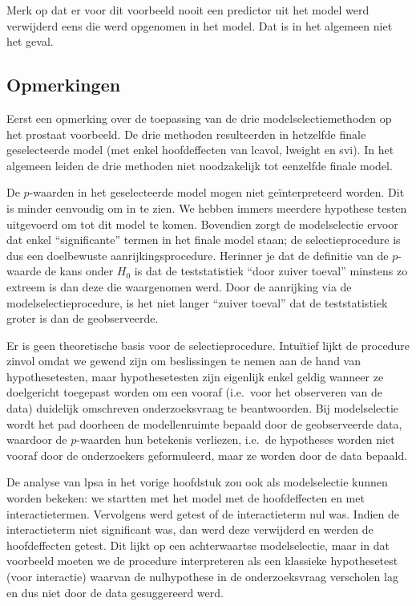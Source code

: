 \documentclass[12pt,dutch,coursenotes]{book}
\theoremstyle{definition}
\theoremstyle{definition}
\theoremstyle{definition}
\theoremstyle{remark}
\begin{document}
Merk op dat er voor dit voorbeeld nooit een predictor uit het model werd
verwijderd eens die werd opgenomen in het model. Dat is in het algemeen
niet het geval.

\subsection{Opmerkingen}\label{opmerkingen}

Eerst een opmerking over de toepassing van de drie modelselectiemethoden
op het prostaat voorbeeld. De drie methoden resulteerden in hetzelfde
finale geselecteerde model (met enkel hoofdeffecten van lcavol, lweight
en svi). In het algemeen leiden de drie methoden niet noodzakelijk tot
eenzelfde finale model.

De \(p\)-waarden in het geselecteerde model mogen niet geïnterpreteerd
worden. Dit is minder eenvoudig om in te zien. We hebben immers meerdere
hypothese testen uitgevoerd om tot dit model te komen. Bovendien zorgt
de modelselectie ervoor dat enkel ``significante'' termen in het finale
model staan; de selectieprocedure is dus een doelbewuste
aanrijkingsprocedure. Herinner je dat de definitie van de \(p\)-waarde
de kans onder \(H_0\) is dat de teststatistiek ``door zuiver toeval''
minstens zo extreem is dan deze die waargenomen werd. Door de aanrijking
via de modelselectieprocedure, is het niet langer ``zuiver toeval'' dat
de teststatistiek groter is dan de geobserveerde.

Er is geen theoretische basis voor de selectieprocedure. Intuïtief lijkt
de procedure zinvol omdat we gewend zijn om beslissingen te nemen aan de
hand van hypothesetesten, maar hypothesetesten zijn eigenlijk enkel
geldig wanneer ze doelgericht toegepast worden om een vooraf (i.e.~voor
het observeren van de data) duidelijk omschreven onderzoeksvraag te
beantwoorden. Bij modelselectie wordt het pad doorheen de modellenruimte
bepaald door de geobserveerde data, waardoor de \(p\)-waarden hun
betekenis verliezen, i.e.~de hypotheses worden niet vooraf door de
onderzoekers geformuleerd, maar ze worden door de data bepaald.

De analyse van lpsa in het vorige hoofdstuk zou ook als modelselectie
kunnen worden bekeken: we startten met het model met de hoofdeffecten en
met interactietermen. Vervolgens werd getest of de interactieterm nul
was. Indien de interactieterm niet significant was, dan werd deze
verwijderd en werden de hoofdeffecten getest. Dit lijkt op een
achterwaartse modelselectie, maar in dat voorbeeld moeten we de
procedure interpreteren als een klassieke hypothesetest (voor
interactie) waarvan de nulhypothese in de onderzoeksvraag verscholen lag
en dus niet door de data gesuggereerd werd.
\end{document}
